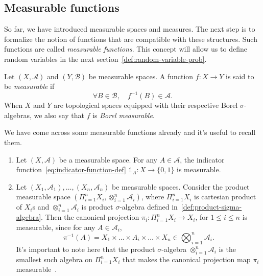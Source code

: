 \subsection{Measurable functions}\label{subsec:measurable-functions}

So far, we have introduced measurable spaces and measures. The next step is to formalize the notion of functions that are compatible with these structures. Such functions are called \emph{measurable functions}. This concept will allow us to define random variables in the next section~\ref{def:random-variable-prob}.

\begin{definition}
    \label{def:measurable-function}
    Let $(X, \mathcal{A})$ and $(Y, \mathcal{B})$ be measurable spaces. A function $f : X \to Y$ is said to be \emph{measurable} if
    \[
        \forall B \in \mathcal{B}, \quad f^{-1}(B) \in \mathcal{A}.
    \]
    When $X$ and $Y$ are topological spaces equipped with their respective Borel $\sigma$-algebras, we also say that $f$ is \emph{Borel measurable}.
\end{definition}


\begin{example}
    We have come across some measurable functions already and it's useful to recall them.
    \label{ex:measurable-functions}

    \begin{enumerate}
        \item Let $(X, \mathcal{A})$ be a measurable space. For any $A \in \mathcal{A}$, the indicator function~\ref{eq:indicator-function-def} $\mathds{1}_A: X \to \{0, 1\}$ is measurable.
        \item Let $(X_1, \mathcal{A}_1), \dots, (X_n, \mathcal{A}_n)$ be measurable spaces. Consider the product measurable space $(\Pi_{i=1}^n X_i, \otimes_{i=1}^n \mathcal{A}_i)$, where $\Pi_{i=1}^n X_i$ is cartesian product of $X_i$s and $\otimes_{i=1}^n \mathcal{A}_i$ is product $\sigma$-algebra defined in~\ref{def:product-sigma-algebra}. Then the canonical projection $\pi_i: \Pi_{i=1}^n X_i \to X_i$, for $1 \leq i \leq n$ is measurable, since for any $A \in \mathcal{A}_i$,
        \[
            \pi^{-1}(A) = X_1 \times \dots \times A_i \times \dots \times X_n \in \bigotimes_{i=1}^n \mathcal{A}_i.
        \]
        It's important to note here that the product $\sigma$-algebra $\otimes_{i=1}^n \mathcal{A}_i$ is the smallest such algebra on $\Pi_{i=1}^n X_i$ that makes the canonical projection map $\pi_i$ measurable~\cite[\S 8.1, p.243]{MeasureTheoryCohn}.
    \end{enumerate}

\end{example}

